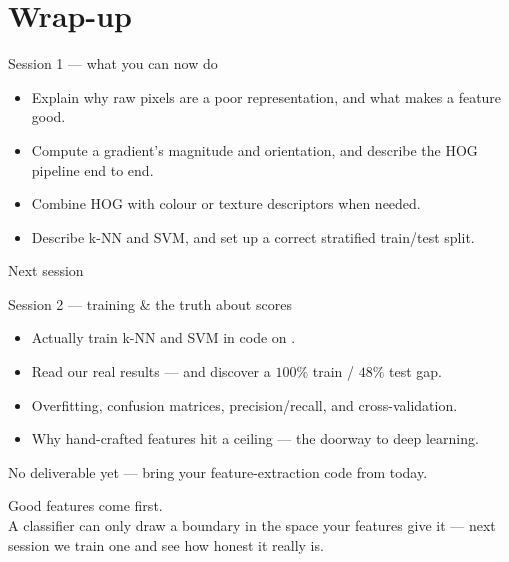 \documentclass[10pt,aspectratio=169]{beamer}
\begin{document}
\section{Wrap-up}

\begin{frame}{Session 1 — what you can now do}
  \begin{itemize}
    \item Explain why raw pixels are a poor representation, and what makes a feature good.
    \item Compute a gradient's magnitude and orientation, and describe the HOG pipeline end to end.
    \item Combine HOG with colour or texture descriptors when needed.
    \item Describe k-NN and SVM, and set up a correct stratified train/test split.
  \end{itemize}
\end{frame}

\begin{frame}{Next session}
  \begin{alertblock}{Session 2 — training \& the truth about scores}
    \begin{itemize}
      \item Actually train k-NN and SVM in code on .
      \item Read our real results — and discover a $100\%$ train / $48\%$ test gap.
      \item Overfitting, confusion matrices, precision/recall, and cross-validation.
      \item Why hand-crafted features hit a ceiling — the doorway to deep learning.
    \end{itemize}
  \end{alertblock}
  No deliverable yet — bring your feature-extraction code from today.
\end{frame}

\begin{frame}[standout]
  Good features come first.\\[4pt]
  \normalsize A classifier can only draw a boundary in the space your features give it —
  next session we train one and see how honest it really is.
\end{frame}
\end{document}
